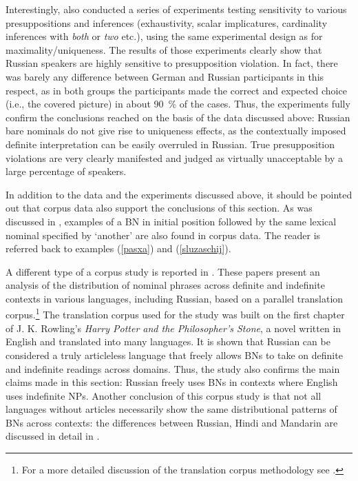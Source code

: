 \documentclass[output=paper,colorlinks,citecolor=brown]{langscibook}
\begin{document}
Interestingly, \citet{simikdemian20} also conducted a series of experiments testing sensitivity to various presuppositions and inferences (exhaustivity, scalar implicatures, cardinality inferences with \textit{both} or \textit{two} etc.), using the same experimental design as for maximality/uniqueness. The results of those experiments clearly show that Russian speakers are highly sensitive to presupposition violation. In fact, there was barely any difference between German and Russian participants in this respect, as in both groups the participants made the correct and expected choice (i.e., the covered picture) in about \qty{90}{\percent} of the cases. Thus, the experiments fully confirm the conclusions reached on the basis of the data discussed above: Russian bare nominals do not give rise to uniqueness effects, as the contextually imposed definite interpretation can be easily overruled in Russian. True presupposition violations are very clearly manifested and judged as virtually unacceptable by a large percentage of speakers.

In addition to the data and the experiments discussed above, it should be pointed out that corpus data also support the conclusions of this section. As was discussed in , examples of a BN in initial position followed by the same lexical nominal specified by `another' are also found in corpus data. The reader is referred back to examples (\ref{pasxa}) and (\ref{sluzaschij}). 

A different type of a corpus study is reported in \citet{Liu.etal2023, Borik.etal2025, liusalt}. These papers present an analysis of the distribution of nominal phrases across definite and indefinite contexts in various languages, including Russian, based on a parallel translation corpus.\footnote{For a more detailed discussion of the translation corpus methodology see \citet{LeBruyn.et.al2022a,LeBruyn.deSwart2022}.} The translation corpus used for the study was built on the first chapter of J. K. Rowling's \textit{Harry Potter and the Philosopher's Stone}, a novel written in English and translated into many languages. It is shown that Russian can be considered a truly articleless language that freely allows BNs to take on definite and indefinite readings across domains. Thus, the study also confirms the main claims made in this section: Russian freely uses BNs in contexts where English uses indefinite NPs. Another conclusion of this corpus study is that not all languages without articles necessarily show the same distributional patterns of BNs across contexts: the differences between Russian, Hindi and Mandarin are discussed in detail in \citet{Liu.etal2023}.
\end{document}

